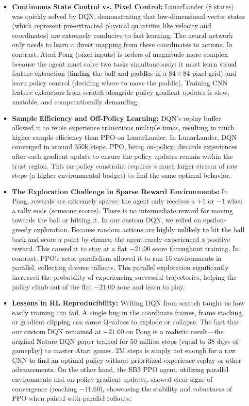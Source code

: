 \documentclass[12pt]{article}
\begin{document}
\begin{itemize}
  \item \textbf{Continuous State Control vs. Pixel Control:} 
    LunarLander (8 states) was quickly solved by DQN, demonstrating that low-dimensional vector states (which represent pre-extracted physical quantities like velocity and coordinates) are extremely conducive to fast learning. The neural network only needs to learn a direct mapping from these coordinates to actions. In contrast, Atari Pong (pixel inputs) is orders of magnitude more complex because the agent must solve two tasks simultaneously: it must learn visual feature extraction (finding the ball and paddles in a $84\times84$ pixel grid) and learn policy control (deciding where to move the paddle). Training CNN feature extractors from scratch alongside policy gradient updates is slow, unstable, and computationally demanding.
  
  \item \textbf{Sample Efficiency and Off-Policy Learning:} 
    DQN's replay buffer allowed it to reuse experience transitions multiple times, resulting in much higher sample efficiency than PPO on LunarLander. In LunarLander, DQN converged in around 350k steps. PPO, being on-policy, discards experiences after each gradient update to ensure the policy updates remain within the trust region. This on-policy constraint requires a much larger stream of raw steps (a higher environmental budget) to find the same optimal behavior.
    
  \item \textbf{The Exploration Challenge in Sparse Reward Environments:}
    In Pong, rewards are extremely sparse: the agent only receives a $+1$ or $-1$ when a rally ends (someone scores). There is no intermediate reward for moving towards the ball or hitting it. In our custom DQN, we relied on epsilon-greedy exploration. Because random actions are highly unlikely to hit the ball back and score a point by chance, the agent rarely experienced a positive reward. This caused it to stay at a flat $-21.00$ score throughout training. In contrast, PPO's actor parallelism allowed it to run 16 environments in parallel, collecting diverse rollouts. This parallel exploration significantly increased the probability of experiencing successful trajectories, helping the policy climb out of the flat $-21.00$ zone and learn to play.

  \item \textbf{Lessons in RL Reproducibility:} 
    Writing DQN from scratch taught us how easily training can fail. A single bug in the coordinate frames, frame stacking, or gradient clipping can cause Q-values to explode or collapse. The fact that our custom DQN remained at $-21.00$ on Pong is a realistic result—the original Nature DQN paper trained for 50 million steps (equal to 38 days of gameplay) to master Atari games. 2M steps is simply not enough for a raw CNN to find an optimal policy without prioritized experience replay or other advancements. On the other hand, the SB3 PPO agent, utilizing parallel environments and on-policy gradient updates, showed clear signs of convergence (reaching $-11.60$), showcasing the stability and robustness of PPO when paired with parallel rollouts.


\end{itemize}
\end{document}
